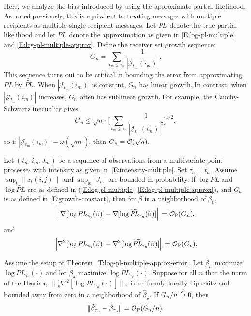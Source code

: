 \documentclass[aoas,preprint]{imsart}
\begin{document}
Here, we analyze the bias introduced by using the approximate partial
likelihood.  As noted previously, this is equivalent to treating messages with
multiple recipients as multiple single-recipient messages.  Let
$\mathit{PL}$ denote the true partial likelihood and let $\widetilde{\mathit{PL}}$
denote the approximation as given in \eqref{E:log-pl-multiple}
and \eqref{E:log-pl-multiple-approx}.  Define the receiver set growth
sequence:
\begin{equation}\label{E:growth-constant}
    G_n
        =
            \sum_{t_m \leq \tau_n}
                \frac{1}{|\mathcal{J}_{t_m}(i_m)|}.
\end{equation}
This sequence turns out to be critical
in bounding the error from approximating $\mathit{PL}$ by
$\widetilde{\mathit{PL}}.$  When $|\mathcal{J}_{t_m}(i_m)|$ is
constant, $G_n$ has linear growth.  In contrast, when
$|\mathcal{J}_{t_m}(i_m)|$ increases, $G_n$ often has sublinear growth.
For example, the Cauchy-Schwartz inequality gives
\[
    G_n
        \leq
            \sqrt{n}
            \cdot
            \bigg[
                \sum_{t_m \leq \tau_n}
                    \frac{1}{|\mathcal{J}_{t_m}(i_m)|^2}
            \bigg]^{1/2},
\]
so if $|\mathcal{J}_{t_m}(i_m)| = \omega(\sqrt{m})$, then
$G_n = \mathcal{O}(\sqrt{n})$.

\begin{theorem}\label{T:log-pl-multiple-approx-error}
    Let $(t_m, i_m, J_m)$ be a sequence of observations from a multivariate
    point processes with intensity as given in~\eqref{E:intensity-multiple}.
    Set $\tau_n = t_n$.  Assume
    \(
        \sup_t \| x_t (i,j) \|
    \)
    and
    \(
        \sup_m | J_m |
    \)
    are bounded in probability.  
    If $\log \mathit{PL}$ and $\log \widetilde{\mathit{PL}}$ are as
    defined in
    \textnormal{(}\ref{E:log-pl-multiple}--\ref{E:log-pl-multiple-approx}\textnormal{)},
    and $G_n$ is as defined in \eqref{E:growth-constant},
    then for $\beta$ in a neighborhood of $\beta_0$,
    \[
        \Big\|
        \nabla [\log \mathit{PL}_{\tau_n}(\beta) ]
        -
        \nabla [\log \widetilde{\mathit{PL}}_{\tau_n}(\beta) ]
        \Big\|
            =
            \mathcal{O}_\text{P}(G_n),
    \]
    and
    \[
        \Big\|
        \nabla^2 [\log \mathit{PL}_{\tau_n}(\beta) ]
        -
        \nabla^2 [\log \widetilde{\mathit{PL}}_{\tau_n}(\beta) ]
        \Big\|
            =
            \mathcal{O}_\text{P}(G_n).
    \]
\end{theorem}
\begin{corollary}\label{C:mple-approx-error}
    Assume the setup of Theorem~\ref{T:log-pl-multiple-approx-error}.
    Let $\hat \beta_n$ maximize $\log \mathit{PL}_{\tau_n}(\cdot)$
    and let $\tilde \beta_n$ maximize
    $\log \widetilde{\mathit{PL}}_{\tau_n}(\cdot)$. 
    Suppose for all $n$ that the norm of the Hessian,
    \(
        \|
        \tfrac{1}{n}
        \nabla^2
        [ \log \mathit{PL}_{\tau_n}(\cdot)]
        \|,
    \)
    is uniformly locally Lipschitz and bounded away from zero
    in a neighborhood of $\hat \beta_n$.
    If $G_n/n \overset{\mathit{P}}{\to} 0$, then
    \[
        \| \tilde \beta_{\tau_n} - \hat \beta_{\tau_n} \|
            =
            \mathcal{O}_\text{P}(G_n/n).
    \]
\end{corollary}
\end{document}
